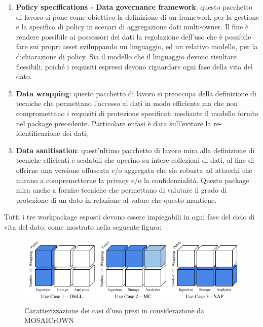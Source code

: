 \documentclass[12pt,a4paper,twoside]{book}
\begin{document}
\begin{enumerate}
\label{tesiWP}
\item \textbf{Policy specifications - Data governance framework}: questo pacchetto di lavoro si pone come obiettivo la definizione di un framework per la gestione e la specifica di policy in scenari di aggregazione dati multi-owner. Il fine è rendere possibile ai possessori dei dati la regolazione dell'uso che è possibile fare sui propri asset sviluppando un linguaggio, ed un relativo modello, per la dichiarazione di policy. Sia il modello che il linguaggio devono risultare flessibili, poiché i requisiti espressi devono riguardare ogni fase della vita del dato.
\item \textbf{Data wrapping}: questo pacchetto di lavoro si preoccupa della definizione di tecniche che permettano l'accesso ai dati in modo efficiente ma che non compromettano i requisiti di protezione specificati mediante il modello fornito nel package precedente. Particolare enfasi è data sull'evitare la re-identificazione dei dati;
\item \textbf{Data sanitisation}: quest'ultimo pacchetto di lavoro mira alla definizione di tecniche efficienti e scalabili che operino su intere collezioni di dati, al fine di offrirne una versione offuscata e/o aggregata che sia robusta ad attacchi che mirano a compremetterne la privacy e/o la confidenzialità. Questo package mira anche a fornire tecniche che permettano di valutare il grado di protezione di un dato in relazione al valore che questo mantiene. 
\end{enumerate}
Tutti i tre workpackage esposti devono essere impiegabili in ogni fase del ciclo di vita del dato, come mostrato nella seguente figura:
\begin{figure}[H]
\centering
\includegraphics[scale=.65]{../immagini/MOSAICOUSES.png}
\caption{Caratterizzazione dei casi d'uso presi in considerazione da MOSAICrOWN\cite{ProgettoMosaico}}
\label{MosUses}
\end{figure}
\end{document}
